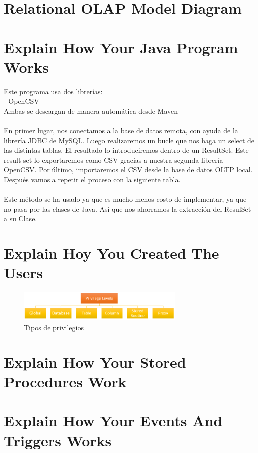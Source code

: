 \documentclass[%
,twoside
]{article}
\begin{document}
\section{Relational OLAP Model Diagram}
\section{Explain How Your Java Program Works}
\paragraph{}
Este programa usa dos librerías:\\
-	OpenCSV\\
Ambas se descargan de manera automática desde Maven 
\paragraph{}
En primer lugar, nos conectamos a la base de datos remota, con ayuda de la librería JDBC de MySQL. Luego realizaremos un bucle que nos haga un select de las distintas tablas. El resultado lo introduciremos dentro de un ResultSet. Este result set lo exportaremos como CSV gracias a nuestra segunda librería OpenCSV. Por último, importaremos el CSV desde la base de datos OLTP local. Después vamos a repetir el proceso con la siguiente tabla.
\paragraph{}
Este método se ha usado ya que es mucho menos costo de implementar, ya que no pasa por las clases de Java. Así que nos ahorramos la extracción del ResulSet a su Clase.

\section{Explain Hoy You Created The Users}
\begin{figure}[H]
  \centering
  \includegraphics[width=8cm]{privilege.png}
  \caption{Tipos de privilegios}
\end{figure}
\section{Explain How Your Stored Procedures Work}
\section{Explain How Your Events And Triggers Works}
\end{document}
